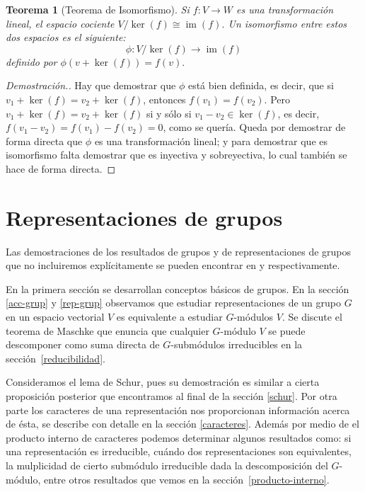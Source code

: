 \documentclass[12pt]{book}
\newtheorem{theorem}{Teorema}[section]
\theoremstyle{definition}
\DeclareMathOperator{\im}{im}
\newcounter{in}
\newcounter{ini}
\begin{document}
\begin{theorem}[Teorema de Isomorfismo]
  \label{teorema-isomorfismo-esp}
  Si $f:V\rightarrow W$ es una transformación lineal, el espacio
  cociente $V/\ker(f)\cong \im(f)$. Un isomorfismo entre estos dos
  espacios es el siguiente:
  $$\phi:V/\ker(f)\rightarrow \im(f)$$
  definido por $\phi(v+\ker(f))=f(v).$
\end{theorem}
\begin{proof}[Demostración.]
  Hay que demostrar que $\phi$ está bien definida, es decir, que si
  $v_1+\ker(f)=v_2+\ker(f)$, entonces
  $f(v_1)=f(v_{2}).$ Pero
  $v_1+\ker(f)=v_2+\ker(f)$ si y sólo si
  $v_{1}-v_{2}\in \ker(f)$, es decir,
  $f(v_{1}-v_{2})=f(v_1)-f(v_2)=0$,
  como se quería. Queda por demostrar de forma directa que $\phi$ es
  una transformación lineal; y para demostrar que es isomorfismo falta
  demostrar que es inyectiva y sobreyectiva, lo cual también se hace
  de forma directa.
\end{proof}

\chapter{Representaciones de grupos}
\label{Representaciones de grupos}

Las demostraciones de los resultados de grupos y de representaciones
de grupos que no incluiremos explícitamente se pueden encontrar en
\cite{fraleigh} y \cite{james2001representations} respectivamente.

En la primera sección se desarrollan conceptos básicos de grupos. En
la sección \ref{acc-grup} y  \ref{rep-grup} observamos que estudiar
representaciones de un grupo $G$ en un espacio vectorial $V$ es
equivalente a estudiar $G$-módulos $V$. Se discute el teorema de
Maschke que enuncia que cualquier $G$-módulo $V$ se puede descomponer
como suma directa de $G$-submódulos irreducibles en la sección~\ref{reducibilidad}. 

Consideramos el lema de Schur, pues su demostración es similar a
cierta proposición posterior que encontramos al final de la sección
\ref{schur}. Por otra parte los caracteres de una representación nos
proporcionan información acerca de ésta, se describe con detalle en la
sección \ref{caracteres}. Además por medio de el producto interno de
caracteres podemos determinar algunos resultados como: si una
representación es irreducible, cuándo dos representaciones son
equivalentes, la mulplicidad de cierto submódulo irreducible dada la
descomposición del $G$-módulo, entre otros resultados que vemos en la
sección~\ref{producto-interno}. 
\end{document}

